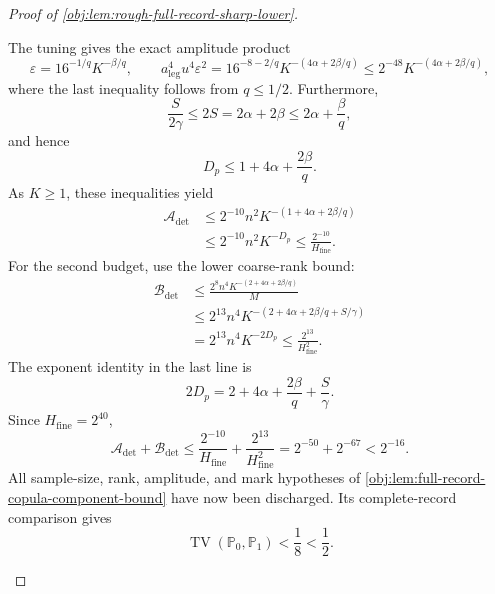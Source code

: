 \begin{proof}[Proof of \cref{obj:lem:rough-full-record-sharp-lower}]
\begin{enumerate}
The tuning gives the exact amplitude product
\[
\varepsilon=16^{-1/q}K^{-\beta/q},
\qquad
a_{\mathrm{leg}}^4u^4\varepsilon^2
=
16^{-8-2/q}K^{-(4\alpha+2\beta/q)}
\le
2^{-48}K^{-(4\alpha+2\beta/q)},
\]
where the last inequality follows from \(q\le1/2\).
Furthermore,
\[
\frac{S}{2\gamma}\le2S
=2\alpha+2\beta
\le2\alpha+\frac{\beta}{q},
\]
and hence
\[
D_p\le1+4\alpha+\frac{2\beta}{q}.
\]
As \(K\ge1\), these inequalities yield
\[
\begin{aligned}
\mathcal A_{\mathrm{det}}
&\le
2^{-10}n^2K^{-(1+4\alpha+2\beta/q)}\\
&\le2^{-10}n^2K^{-D_p}
\le\frac{2^{-10}}{H_{\mathrm{fine}}}.
\end{aligned}
\]
For the second budget, use the lower coarse-rank bound:
\[
\begin{aligned}
\mathcal B_{\mathrm{det}}
&\le
\frac{2^8n^4K^{-(2+4\alpha+2\beta/q)}}{M}\\
&\le
2^{13}n^4
K^{-(2+4\alpha+2\beta/q+S/\gamma)}\\
&=
2^{13}n^4K^{-2D_p}
\le\frac{2^{13}}{H_{\mathrm{fine}}^2}.
\end{aligned}
\]
The exponent identity in the last line is
\[
2D_p=2+4\alpha+\frac{2\beta}{q}+\frac{S}{\gamma}.
\]
Since \(H_{\mathrm{fine}}=2^{40}\),
\[
\mathcal A_{\mathrm{det}}+\mathcal B_{\mathrm{det}}
\le
\frac{2^{-10}}{H_{\mathrm{fine}}}
+\frac{2^{13}}{H_{\mathrm{fine}}^2}
=
2^{-50}+2^{-67}<2^{-16}.
\]
All sample-size, rank, amplitude, and mark hypotheses of
\cref{obj:lem:full-record-copula-component-bound} have now been discharged. Its complete-record comparison gives
\[
\operatorname{TV}(\mathbb P_0,\mathbb P_1)
<\frac18<\frac12.
\]


\end{enumerate}
\end{proof}
